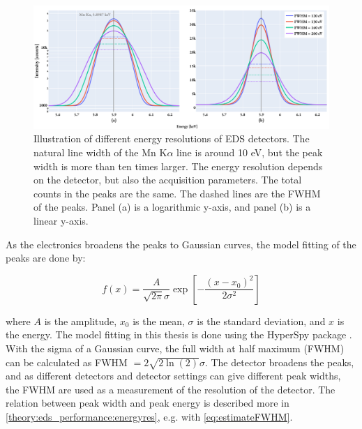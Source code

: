 \begin{figure}[ht]
    \centering
    \includegraphics[width=0.95\linewidth]{figures/eds_energyResolutionsMnKa.pdf}
    \caption{
        Illustration of different energy resolutions of EDS detectors.
        The natural line width of the Mn K$\alpha$ line is around 10 eV, but the peak width is more than ten times larger.
        The energy resolution depends on the detector, but also the acquisition parameters.
        The total counts in the peaks are the same.
        The dashed lines are the FWHM of the peaks.
        Panel (a) is a logarithmic y-axis, and panel (b) is a linear y-axis.
    }
    \label{fig:theory:energy_resolution}
\end{figure}





As the electronics broadens the peaks to Gaussian curves, the model fitting of the peaks are done by:

\begin{equation}
    \label{eq:gaussian}
    f(x) = \frac{A}{\sqrt{2\pi}\sigma}\exp\left[{-\frac{(x-x_0)^2}{2\sigma^2}}\right]
\end{equation}

where $A$ is the amplitude, $x_0$ is the mean, $\sigma$ is the standard deviation, and $x$ is the energy.
The model fitting in this thesis is done using the HyperSpy package \cite{hyperspy_1.7.1}.
With the sigma of a Gaussian curve, the full width at half maximum (FWHM) can be calculated as FWHM $= 2\sqrt{2\ln(2)}\sigma$.
The detector broadens the peaks, and as different detectors and detector settings can give different peak widths, the FWHM are used as a measurement of the resolution of the detector.
The relation between peak width and peak energy is described more in \cref{theory:eds_performance:energyres}, e.g. with \cref{eq:estimateFWHM}.































